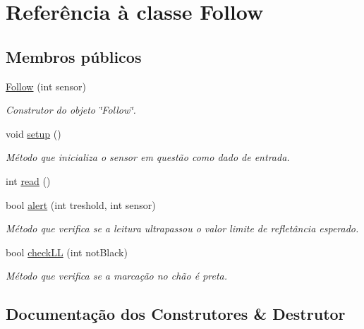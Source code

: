 \hypertarget{class_follow}{}\section{Referência à classe Follow}
\label{class_follow}
\subsection*{Membros públicos}
\begin{DoxyCompactItemize}
\item 
\mbox{\hyperlink{class_follow_a9f7d35bd142ceb97d843c66c7d531da7}{Follow}} (int sensor)
\begin{DoxyCompactList}\small\item\em Construtor do objeto \char`\"{}\+Follow\char`\"{}. \end{DoxyCompactList}\item 
\mbox{\label{class_follow_aafdfa3a55f4452e711851b779d254ba6}} 
void \mbox{\hyperlink{class_follow_aafdfa3a55f4452e711851b779d254ba6}{setup}} ()
\begin{DoxyCompactList}\small\item\em Método que inicializa o sensor em questão como dado de entrada. \end{DoxyCompactList}\item 
int \mbox{\hyperlink{class_follow_a819180a10759319966d6d81565698fb8}{read}} ()
\item 
bool \mbox{\hyperlink{class_follow_af29fb2cc78da7fb644583becd37c2570}{alert}} (int treshold, int sensor)
\begin{DoxyCompactList}\small\item\em Método que verifica se a leitura ultrapassou o valor limite de refletância esperado. \end{DoxyCompactList}\item 
bool \mbox{\hyperlink{class_follow_a56dc95b9da7e5fb9ab443d5fd6165c73}{check\+LL}} (int not\+Black)
\begin{DoxyCompactList}\small\item\em Método que verifica se a marcação no chão é preta. \end{DoxyCompactList}\end{DoxyCompactItemize}


\subsection{Documentação dos Construtores \& Destrutor}
\mbox{\label{class_follow_a9f7d35bd142ceb97d843c66c7d531da7}} 
